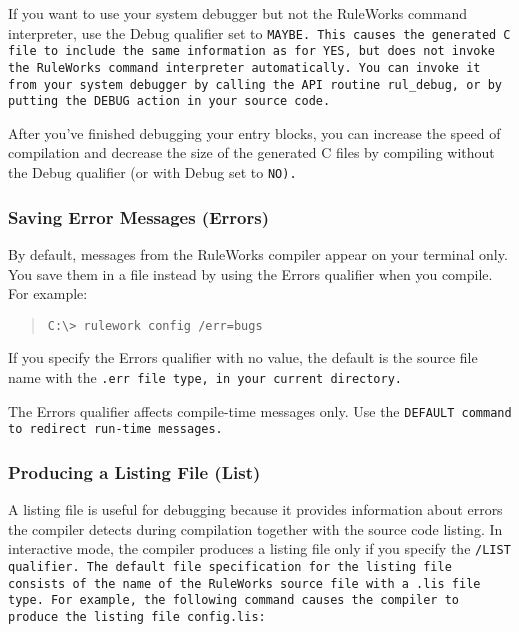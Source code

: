 If you want to use your system debugger but not the RuleWorks command
interpreter, use the Debug qualifier set to \tt{MAYBE}. This causes
the generated C file to include the same information as for \tt{YES},
but does not invoke the RuleWorks command interpreter
automatically. You can invoke it from your system debugger by calling
the API routine \verb|rul_debug|, or by putting the \tt{DEBUG} action
in your source code.

After you've finished debugging your entry blocks, you can increase
the speed of compilation and decrease the size of the generated C
files by compiling without the Debug qualifier (or with Debug set to
\tt{NO}).

\subsubsection{Saving Error Messages (Errors)}

By default, messages from the RuleWorks compiler appear
on your terminal only. You save them in a file instead by
using the Errors qualifier when you compile. For example:

\begin{quote}
\begin{verbatim}
C:\> rulework config /err=bugs
\end{verbatim}
\end{quote}  

If you specify the Errors qualifier with no value, the default is the
source file name with the \tt{.err} file type, in your current
directory.

The Errors qualifier affects compile-time messages only.
Use the \tt{DEFAULT} command to redirect run-time messages.

\subsubsection{Producing a Listing File (List)}

A listing file is useful for debugging because it provides information
about errors the compiler detects during compilation together with the
source code listing.  In interactive mode, the compiler produces a
listing file only if you specify the \tt{/LIST} qualifier. The default
file specification for the listing file consists of the name of the
RuleWorks source file with a \tt{.lis} file type. For example, the
following command causes the compiler to produce the listing file
\tt{config.lis}:

